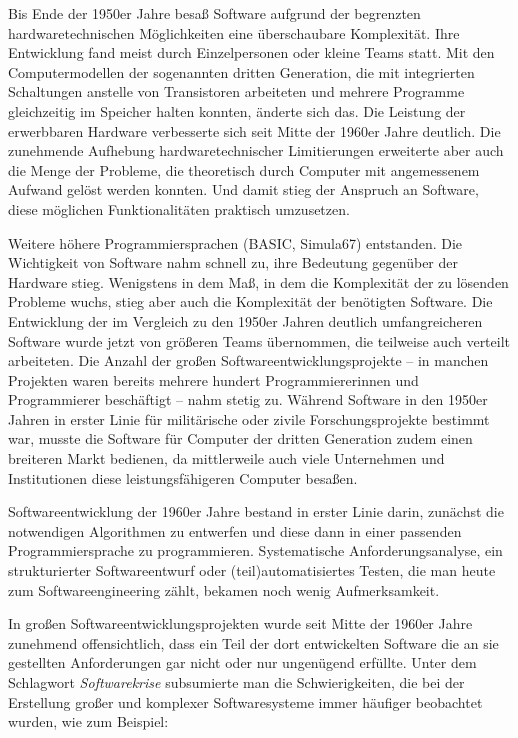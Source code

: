 Bis Ende der 1950er Jahre besaß Software aufgrund der begrenzten hardwaretechnischen Möglichkeiten eine überschaubare Komplexität. Ihre Entwicklung fand meist durch Einzelpersonen oder kleine Teams statt. Mit den Computermodellen der sogenannten dritten Generation, die mit integrierten Schaltungen anstelle von Transistoren arbeiteten und mehrere Programme gleichzeitig im Speicher halten konnten, änderte sich das. Die Leistung der erwerbbaren Hardware verbesserte sich seit Mitte der 1960er Jahre deutlich. Die zunehmende Aufhebung hardwaretechnischer Limitierungen erweiterte aber auch die Menge der Probleme, die theoretisch durch Computer mit angemessenem Aufwand gelöst werden konnten. Und damit stieg der Anspruch an Software, diese möglichen Funktionalitäten praktisch 
\linebreak %
umzusetzen. 

Weitere höhere Programmiersprachen (BASIC, Simula67) entstanden. 
Die Wichtigkeit von Software nahm schnell zu, ihre Bedeutung gegenüber der Hardware stieg. Wenigstens in dem Maß, in dem die Komplexität der zu lösenden Probleme wuchs, stieg aber auch die Komplexität der benötigten Software. Die Entwicklung der im Vergleich zu den 1950er Jahren deutlich umfangreicheren Software wurde jetzt von größeren Teams übernommen, die teilweise auch verteilt arbeiteten. Die Anzahl der großen Softwareentwicklungsprojekte – in manchen Projekten waren bereits mehrere hundert Programmiererinnen und Programmierer beschäftigt – nahm stetig zu. Während Software in den 1950er Jahren in erster Linie für militärische oder zivile Forschungsprojekte bestimmt war, musste die Software für Computer der dritten Generation zudem einen breiteren Markt bedienen, da mittlerweile auch viele Unternehmen und Institutionen diese leistungsfähigeren Computer besaßen. 

Softwareentwicklung der 1960er Jahre bestand in erster Linie darin, zunächst die notwendigen Algorithmen zu entwerfen und diese dann in einer passenden Programmiersprache zu programmieren. Systematische Anforderungsanalyse, ein strukturierter Softwareentwurf oder (teil)automatisiertes Testen, die man heute zum Softwareengineering zählt, bekamen noch wenig Aufmerksamkeit.

\vspace{\baselineskip} %


In großen Softwareentwicklungsprojekten wurde seit Mitte der 1960er Jahre zunehmend offensichtlich, dass ein Teil der dort entwickelten Software die an sie gestellten Anforderungen gar nicht oder nur ungenügend erfüllte. Unter dem Schlagwort \textit{Softwarekrise} subsumierte man die Schwierigkeiten, die bei der Erstellung großer und komplexer Softwaresysteme immer häufiger beobachtet wurden, wie zum Beispiel:

